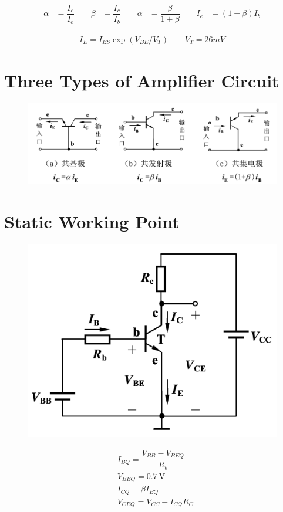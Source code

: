 \begin{equation*}
  \begin{aligned}
    \alpha &= \dfrac{I_{c}}{I_e} \quad\quad 
    \beta &= \dfrac{I_{c}}{I_{b}} \quad\quad 
    \alpha &= \dfrac{\beta}{1 + \beta} \quad\quad
    I_e &= \left( 1 + \beta \right) I_b
  \end{aligned}
\end{equation*}

\begin{equation*}
  \begin{aligned}
    I_E = I_{ES} \exp \left( V_{BE} / V_T \right) \quad\quad V_T = 26 \si{mV}
  \end{aligned}
\end{equation*}

\section{Three Types of Amplifier Circuit}

\begin{figure}[H]
  \centering
  \includegraphics[width=0.9\linewidth]{figures/BJT-three-types}
\end{figure}

\section{Static Working Point}

\begin{figure}[H]
  \centering
  \includegraphics[width=0.4\linewidth]{figures/BJT-static}
\end{figure}

\begin{equation*}
  \begin{aligned}
    & I_{BQ} = \dfrac{V_{BB} - V_{BEQ}}{R_b} \\
    & V_{BEQ} = 0.7 \  \mathrm{V} \\
    & I_{CQ} = \beta I_{BQ} \\
    & V_{CEQ} = V_{CC} - I_{CQ} R_{C}
  \end{aligned}
\end{equation*}

